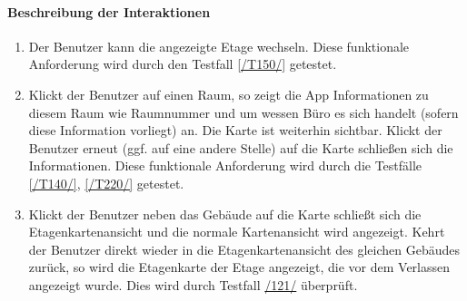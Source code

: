 \paragraph{Beschreibung der Interaktionen}
\begin{enumerate}[start=22, label=\textbf{/FA\arabic*/}, align=left]
    \item \label{/FA22/} Der \Gls{Benutzer} kann die angezeigte Etage wechseln. Diese funktionale Anforderung wird durch den Testfall \ref{/T150/} getestet.
    \item \label{/FA23/} Klickt der \Gls{Benutzer} auf einen Raum, so zeigt die App Informationen zu diesem Raum wie Raumnummer und um wessen Büro es sich handelt (sofern diese Information vorliegt) an. Die \Gls{Karte} ist weiterhin sichtbar. Klickt der \Gls{Benutzer} erneut (ggf. auf eine andere Stelle) auf die \Gls{Karte} schließen sich die Informationen. Diese funktionale Anforderung wird durch die Testfälle \ref{/T140/}, \ref{/T220/} getestet.
    \item \label{/FA24/} Klickt der \Gls{Benutzer} neben das Gebäude auf die \Gls{Karte} schließt sich die \Gls{Etagenkartenansicht} und die normale \Gls{Kartenansicht} wird angezeigt. Kehrt der \Gls{Benutzer} direkt wieder in die \Gls{Etagenkartenansicht} des gleichen Gebäudes zurück, so wird die \Gls{Etagenkarte} der Etage angezeigt, die vor dem Verlassen angezeigt wurde. Dies wird durch Testfall \hyperref[/T121/]{/121/} überprüft.
\end{enumerate}